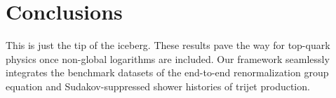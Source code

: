 \section{Conclusions}\label{sec:conclusions}

This is just the tip of the iceberg. These results pave the way for
top-quark physics once non-global logarithms are included. Our framework
seamlessly integrates the benchmark datasets of the end-to-end
renormalization group equation and Sudakov-suppressed shower histories
of trijet production.

